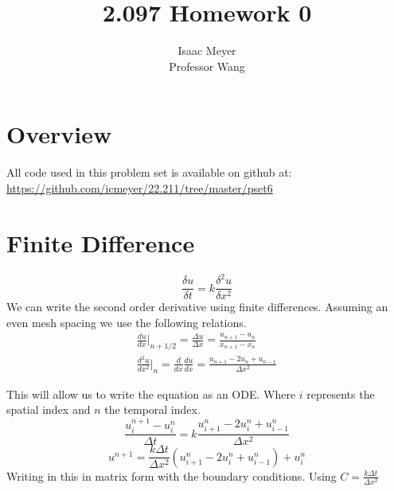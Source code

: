 \documentclass[10pt,letter]{article}
\begin{document}


\title{2.097 Homework 0}

\author{Isaac Meyer\\
        Professor Wang}

 
\maketitle 

\section*{Overview}
All code used in this problem set is available on github at: \url{https://github.com/icmeyer/22.211/tree/master/pset6}\\

\section{Finite Difference}
\[ \frac{\delta u}{\delta t} = k \frac{\delta^2u}{\delta x^2} \]
We can write the second order derivative using finite differences. Assuming an even mesh spacing we use the following relations. 
\begin{align*}
    \frac{du}{dx}\Big|_{n+1/2}=\frac{\Delta u}{\Delta x} = \frac{u_{n+1}-u_n}{x_{n+1}-x_n} \\
    \frac{d^2u}{dx^2}\Big|_{n} = \frac{d}{dx} \frac{du}{dx}= \frac{u_{n+1}-2u_n+u_{n-1}}{\Delta x^2}
\end{align*}

This will allow us to write the equation as an ODE. Where $i$ represents the spatial index and $n$ the temporal index.
\[ \frac{u_i^{n+1}-u_i^n}{\Delta t} = k  \frac{u_{i+1}^n-2u_i^n+u_{i-1}^n}{\Delta x^2} \]
\[ u^{n+1} = \frac{k \Delta t}{\Delta x^2} (u_{i+1}^n-2u_i^n+u_{i-1}^n) + u_i^n \]
Writing in this in matrix form with the boundary conditions. Using $C = \frac{k \Delta t}{\Delta x^2}$
\end{document}
